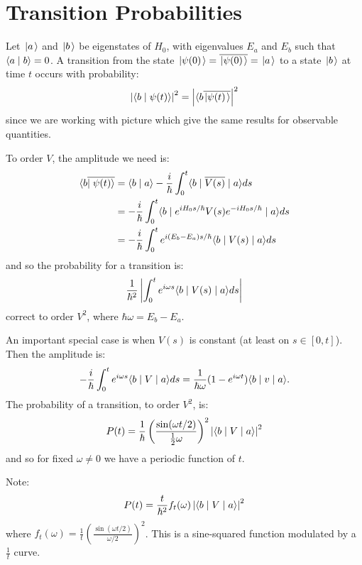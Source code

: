 \documentclass[../Main.tex]{subfiles}
\begin{document}
\section{Transition Probabilities}
Let $\left.\left|a\right.\right\rangle$ and $\left.\left|b\right.\right\rangle$ be eigenstates of $H_0$, with eigenvalues $E_a$ and $E_b$ such that $\langle a\mid b\rangle = 0$. A transition from the state $\left.\left|\psi(0)\right.\right\rangle = \overline{\left.\left|\psi(0)\right.\right\rangle} = \left.\left|a\right.\right\rangle$ to a state $\left.\left|b\right.\right\rangle$ at time $t$ occurs with probability:
\begin{equation*}
    \left|\langle b\mid\psi(t)\rangle\right|^2 = \left|\langle b \overline{\left.\left|\psi(t)\right.\right\rangle}\right|^2
\end{equation*}
since we are working with picture which give the same results for observable quantities.

To order $V$, the amplitude we need is:
\begin{align*}
    \langle b \overline{\mid \psi(t)\rangle} &= \langle b\mid a\rangle - \frac i \hbar \int_{0}^{t} \langle b\mid\overline{V(s)}\mid a\rangle ds \\
    &= -\frac i \hbar \int_{0}^{t} \langle b\mid e^{iH_0 s / \hbar} V(s) e^{-iH_0 s / \hbar}\mid a\rangle ds \\
    &= -\frac i \hbar \int_{0}^{t} e^{i(E_b - E_a) s / \hbar} \langle b\mid V(s)\mid a\rangle ds 
\end{align*}
and so the probability for a transition is:
\begin{equation*}
    \frac1{\hbar^2} \left|\int_{0}^{t} e^{i\omega s}\langle b\mid V(s)\mid a\rangle ds\right|
\end{equation*}
correct to order $V^2$, where $\hbar \omega = E_b - E_a$.

An important special case is when $V(s)$ is constant (at least on $s \in [0, t]$). Then the amplitude is:
\begin{equation*}
    -\frac i \hbar \int_{0}^{t} e^{i\omega s} \langle b\mid V\mid a\rangle ds = \frac1{\hbar\omega} (1 - e^{i\omega t}) \langle b\mid v\mid a\rangle.
\end{equation*}
The probability of a transition, to order $V^2$, is:
\begin{equation*}
    P(t) = \frac1\hbar \left(\frac{\sin(\omega t / 2)}{\frac12 \omega}\right)^2 \left|\langle b\mid V\mid a\rangle\right|^2
\end{equation*}
and so for fixed $\omega \neq 0$ we have a periodic function of $t$.

Note:
\begin{equation*}
    P(t) = \frac{t}{\hbar^2} f_t(\omega) \left|\langle b\mid V\mid a\rangle\right|^2
\end{equation*}
where $f_t(\omega) = \frac1t \left(\frac{\sin(\omega t / 2)}{\omega / 2}\right)^2$. This is a sine-squared function modulated by a $\frac1t$ curve.
\end{document}
